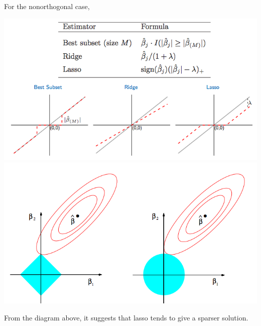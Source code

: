 \documentclass{article}
\begin{document}
For the nonorthogonal case,
\begin{center}
  \includegraphics[scale=0.5]{assets/linear_regression_estimator} \\
  \includegraphics[scale=0.5]{assets/ridge_and_lasso}
\end{center}
From the diagram above, it suggests that lasso tends to give a sparser solution.
\end{document}
